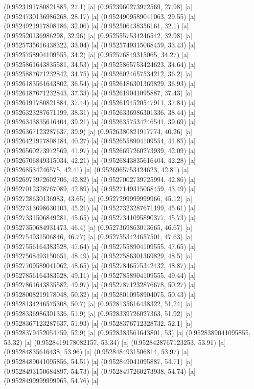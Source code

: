 {{{(0.9523191780821885, 27.1) [a] 
(0.9523960273972569, 27.98) [a] 
(0.9524730136986268, 28.17) [a] 
(0.9524909589041063, 29.55) [a] 
(0.9524921917808186, 32.06) [a] 
(0.952506438356161, 32.1) [a] 
(0.952520136986298, 32.96) [a] 
(0.9525557534246542, 32.98) [a] 
(0.9525735616438322, 33.04) [a] 
(0.9525749315068459, 33.43) [a] 
(0.9525758904109555, 34.2) [a] 
(0.952576849315065, 34.27) [a] 
(0.9525861643835581, 34.53) [a] 
(0.9525865753424623, 34.64) [a] 
(0.9525887671232842, 34.75) [a] 
(0.9526024657534212, 36.2) [a] 
(0.9526183561643802, 36.54) [a] 
(0.9526186301369829, 36.93) [a] 
(0.9526187671232843, 37.33) [a] 
(0.952619041095887, 37.43) [a] 
(0.9526191780821884, 37.44) [a] 
(0.9526194520547911, 37.84) [a] 
(0.9526323287671199, 38.31) [a] 
(0.9526336986301336, 38.44) [a] 
(0.9526343835616404, 39.21) [a] 
(0.9526357534246541, 39.69) [a] 
(0.9526367123287637, 39.9) [a] 
(0.9526380821917774, 40.26) [a] 
(0.9526421917808184, 40.27) [a] 
(0.9526558904109554, 41.85) [a] 
(0.9526560273972569, 41.97) [a] 
(0.9526697260273939, 42.09) [a] 
(0.9526706849315034, 42.21) [a] 
(0.9526843835616404, 42.28) [a] 
(0.95268534246575, 42.41) [a] 
(0.9526965753424623, 42.81) [a] 
(0.9526973972602706, 42.82) [a] 
(0.9527002739725994, 42.86) [a] 
(0.9527012328767089, 42.89) [a] 
(0.9527149315068459, 43.49) [a] 
(0.952728630136983, 43.65) [a] 
(0.9527299999999966, 45.12) [a] 
(0.9527313698630103, 45.21) [a] 
(0.9527323287671199, 45.61) [a] 
(0.9527331506849281, 45.65) [a] 
(0.9527341095890377, 45.73) [a] 
(0.9527350684931473, 46.4) [a] 
(0.9527369863013665, 46.67) [a] 
(0.952754931506846, 46.77) [a] 
(0.9527553424657501, 47.63) [a] 
(0.9527556164383528, 47.64) [a] 
(0.9527558904109555, 47.65) [a] 
(0.9527568493150651, 48.49) [a] 
(0.9527586301369829, 48.5) [a] 
(0.9527709589041062, 48.65) [a] 
(0.9527846575342432, 48.87) [a] 
(0.9527856164383528, 49.11) [a] 
(0.9527858904109555, 49.44) [a] 
(0.9527861643835582, 49.97) [a] 
(0.9527871232876678, 50.27) [a] 
(0.9528008219178048, 50.32) [a] 
(0.9528010958904075, 50.43) [a] 
(0.9528134246575308, 50.7) [a] 
(0.9528135616438322, 51.24) [a] 
(0.9528336986301336, 51.9) [a] 
(0.9528339726027363, 51.92) [a] 
(0.9528367123287637, 51.93) [a] 
(0.9528376712328732, 52.1) [a] 
(0.9528379452054759, 52.9) [a] 
(0.9528383561643801, 53) [a] 
(0.9528389041095855, 53.32) [a] 
(0.9528419178082157, 53.34) [a] 
(0.9528428767123253, 53.91) [a] 
(0.95284835616438, 53.96) [a] 
(0.9528484931506814, 53.97) [a] 
(0.9528489041095856, 54.51) [a] 
(0.952849041095887, 54.71) [a] 
(0.9528493150684897, 54.73) [a] 
(0.9528497260273938, 54.74) [a] 
(0.9528499999999965, 54.76) [a] 
}}}
